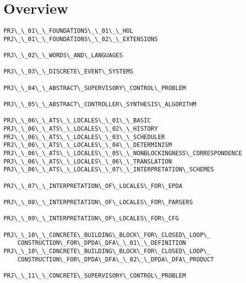 \chapter{Overview}
\begingroup\footnotesize
\begin{verbatim}
PRJ\_\_01\_\_FOUNDATIONS\_\_01\_\_HOL
PRJ\_\_01\_\_FOUNDATIONS\_\_02\_\_EXTENSIONS

PRJ\_\_02\_\_WORDS\_AND\_LANGUAGES

PRJ\_\_03\_\_DISCRETE\_EVENT\_SYSTEMS

PRJ\_\_04\_\_ABSTRACT\_SUPERVISORY\_CONTROL\_PROBLEM

PRJ\_\_05\_\_ABSTRACT\_CONTROLLER\_SYNTHESIS\_ALGORITHM

PRJ\_\_06\_\_ATS\_\_LOCALES\_\_01\_\_BASIC
PRJ\_\_06\_\_ATS\_\_LOCALES\_\_02\_\_HISTORY
PRJ\_\_06\_\_ATS\_\_LOCALES\_\_03\_\_SCHEDULER
PRJ\_\_06\_\_ATS\_\_LOCALES\_\_04\_\_DETERMINISM
PRJ\_\_06\_\_ATS\_\_LOCALES\_\_05\_\_NONBLOCKINGNESS\_CORRESPONDENCE
PRJ\_\_06\_\_ATS\_\_LOCALES\_\_06\_\_TRANSLATION
PRJ\_\_06\_\_ATS\_\_LOCALES\_\_07\_\_INTERPRETATION\_SCHEMES

PRJ\_\_07\_\_INTERPRETATION\_OF\_LOCALES\_FOR\_EPDA

PRJ\_\_08\_\_INTERPRETATION\_OF\_LOCALES\_FOR\_PARSERS

PRJ\_\_09\_\_INTERPRETATION\_OF\_LOCALES\_FOR\_CFG

PRJ\_\_10\_\_CONCRETE\_BUILDING\_BLOCK\_FOR\_CLOSED\_LOOP\_
    CONSTRUCTION\_FOR\_DPDA\_DFA\_\_01\_\_DEFINITION
PRJ\_\_10\_\_CONCRETE\_BUILDING\_BLOCK\_FOR\_CLOSED\_LOOP\_
    CONSTRUCTION\_FOR\_DPDA\_DFA\_\_02\_\_DPDA\_DFA\_PRODUCT

PRJ\_\_11\_\_CONCRETE\_SUPERVISORY\_CONTROL\_PROBLEM


\end{verbatim}
